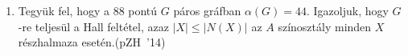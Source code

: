 \documentclass[a4paper, 12pt]{article}
\begin{document}
\begin{enumerate}

\item Tegyük fel, hogy a $88$ pontú $G$ páros gráfban $\alpha(G)=44$. Igazoljuk, hogy $G$-re teljesül a Hall feltétel, azaz $|X|\le |N(X)|$ az $A$ színosztály minden $X$ részhalmaza esetén.\hspace*{0em}\hfill(pZH~'14)


\end{enumerate}
\end{document}
